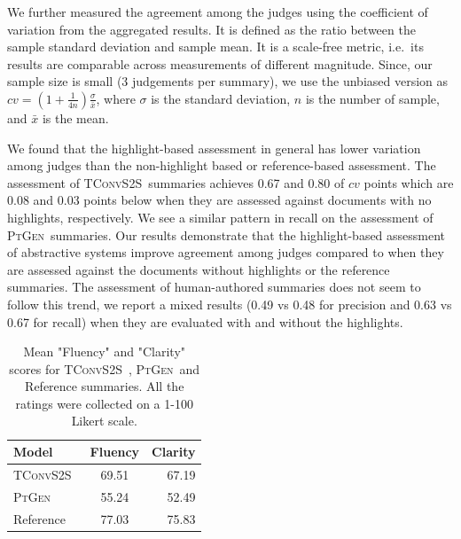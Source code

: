 \documentclass[11pt,a4paper]{article}
\newcommand\ptgen{\textsc{PtGen}}
\newcommand\tconv{\textsc{TConvS2S}}
\begin{document}

We further measured the agreement among the judges using the coefficient of variation \citep{everitt2006cambridge} from the aggregated results. It is defined as the ratio between the sample standard deviation and sample mean. It is a scale-free metric, i.e.\ its results are comparable across measurements of different magnitude.
Since, our sample size is  small (3 judgements per summary), we  use the unbiased version \citep{sokal1995biometry} as $cv = (1 + \frac{1}{4n})\frac{\sigma}{\bar{x}}$, where $\sigma$ is the standard deviation, $n$ is the number of sample, and $\bar{x}$ is the mean.

We found that the highlight-based assessment in general has lower variation among judges than the non-highlight based or reference-based assessment. The assessment of \tconv\ summaries achieves 0.67 and 0.80 of $cv$ points which are 0.08 and 0.03 points below when they are assessed against documents with no highlights, respectively. We see a similar pattern in recall on the assessment of \ptgen\ summaries. Our results demonstrate that the highlight-based assessment of abstractive systems improve agreement among judges compared to when they are assessed against the documents without highlights or the reference summaries. The assessment of human-authored summaries does not seem to follow this trend, we report a mixed results (0.49 vs 0.48 for precision and 0.63 vs 0.67 for recall) when they are evaluated with and without the highlights.



\begin{table}[t!]
\small
\centering
\begin{tabular}{l | cr}
\hline
\textbf{Model} & \textbf{Fluency} & \textbf{Clarity} \\
\hline
\tconv\  & 69.51        & 67.19        \\
\ptgen\      & 55.24        & 52.49        \\
Reference      & 77.03        & 75.83       \\
\hline
\end{tabular}
\caption{Mean "Fluency" and "Clarity" scores for \tconv\ , \ptgen\   and Reference summaries. All the ratings were collected on a 1-100 Likert scale.}
\label{table:fluencyclarityresult}
\end{table}
\end{document}
